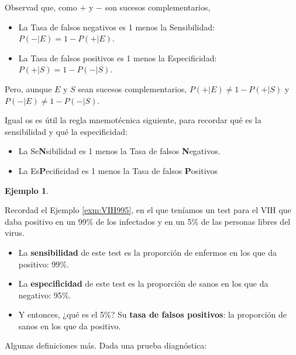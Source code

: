 \documentclass[
]{book}
\theoremstyle{definition}
\theoremstyle{definition}
\newtheorem{example}{Ejemplo}[chapter]
\theoremstyle{definition}
\theoremstyle{definition}
\theoremstyle{remark}
\begin{document}
Observad que, como \(+\) y \(-\) son sucesos complementarios,

\begin{itemize}
\item
  La Tasa de falsos negativos es 1 menos la Sensibilidad: \(P(-|E)=1-P(+|E)\).
\item
  La Tasa de falsos positivos es 1 menos la Especificidad: \(P(+|S)=1-P(-|S)\).
\end{itemize}

\begin{rmdimportant}
Pero, aunque \(E\) y \(S\) sean sucesos complementarios, \(P(+|E)\neq 1-P(+|S)\) y
\(P(-|E)\neq 1-P(-|S)\).
\end{rmdimportant}

\begin{rmdnote}
Igual os es útil la regla mnemotécnica siguiente, para recordar qué es la sensibilidad y qué la especificidad:

\begin{itemize}
\item
  La Se\textbf{N}sibilidad es 1 menos la Tasa de falsos \textbf{N}egativos.
\item
  La Es\textbf{P}ecificidad es 1 menos la Tasa de falsos \textbf{P}ositivos
\end{itemize}
\end{rmdnote}

\begin{example}
\protect\hypertarget{exm:unnamed-chunk-153}{}\label{exm:unnamed-chunk-153}

Recordad el Ejemplo \ref{exm:VIH995}, en el que teníamos un test para el VIH que daba positivo en un 99\% de los infectados y en un 5\% de las personas libres del virus.

\begin{itemize}
\item
  La \textbf{sensibilidad} de este test es la proporción de enfermos en los que da positivo: 99\%.
\item
  La \textbf{especificidad} de este test es la proporción de sanos en los que da negativo: 95\%.
\item
  Y entonces, ¿qué es el 5\%? Su \textbf{tasa de falsos positivos}: la proporción de sanos en los que da positivo.
\end{itemize}

\end{example}

Algunas definiciones más. Dada una prueba diagnóstica:
\end{document}
